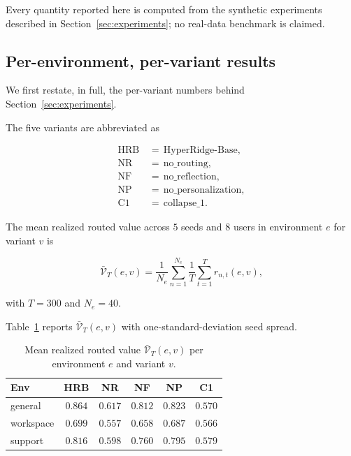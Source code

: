 \documentclass{article} %
\begin{document}
Every quantity reported here is computed from the synthetic experiments described in Section~\ref{sec:experiments}; no real-data benchmark is claimed.

\subsection{Per-environment, per-variant results}

\label{app:per-variant}

We first restate, in full, the per-variant numbers behind Section~\ref{sec:experiments}.

The five variants are abbreviated as

\begin{equation}
\label{eq:app-variants}
\begin{aligned}
\mathrm{HRB} &\,=\, \text{HyperRidge-Base},\\
\mathrm{NR} &\,=\, \mathrm{no\_routing},\\
\mathrm{NF} &\,=\, \mathrm{no\_reflection},\\
\mathrm{NP} &\,=\, \mathrm{no\_personalization},\\
\mathrm{C1} &\,=\, \mathrm{collapse\_1}.
\end{aligned}
\end{equation}

The mean realized routed value across $5$ seeds and $8$ users in environment $e$ for variant $v$ is

\begin{equation}
\label{eq:app-mean-reward-def}
\bar{\mathcal{V}}_T(e,v) = \frac{1}{N_e}\sum_{n=1}^{N_e}\frac{1}{T}\sum_{t=1}^{T}r_{n,t}(e,v),
\end{equation}

with $T=300$ and $N_e=40$.

Table~\ref{tab:app-mean-reward-sweeps} reports $\bar{\mathcal{V}}_T(e,v)$ with one-standard-deviation seed spread.

\begin{table}[h]
\centering
\small
\begin{tabular}{lccccc}
\toprule
Env & HRB & NR & NF & NP & C1 \\
\midrule
general    & $0.864$ & $0.617$ & $0.812$ & $0.823$ & $0.570$ \\
workspace  & $0.699$ & $0.557$ & $0.658$ & $0.687$ & $0.566$ \\
support    & $0.816$ & $0.598$ & $0.760$ & $0.795$ & $0.579$ \\
\bottomrule
\end{tabular}
\caption{Mean realized routed value $\bar{\mathcal{V}}_T(e,v)$ per environment $e$ and variant $v$.}
\label{tab:app-mean-reward-sweeps}
\end{table}
\end{document}
